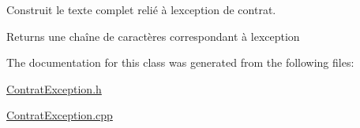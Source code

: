 Construit le texte complet relié à l\textquotesingle{}exception de contrat. 

\begin{DoxyReturn}{Returns}
une chaîne de caractères correspondant à l\textquotesingle{}exception 
\end{DoxyReturn}


The documentation for this class was generated from the following files\+:\begin{DoxyCompactItemize}
\item 
\hyperlink{ContratException_8h}{Contrat\+Exception.\+h}\item 
\hyperlink{ContratException_8cpp}{Contrat\+Exception.\+cpp}\end{DoxyCompactItemize}
